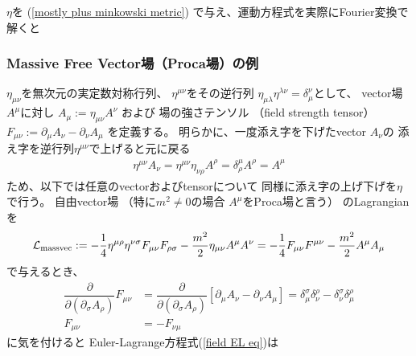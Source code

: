 $\eta$を
(\ref{mostly plus minkowski metric})
で与え、運動方程式を実際にFourier変換で解くと

\subsubsection{Massive Free Vector場（Proca場）の例}

$\eta_{\mu\nu}$を無次元の実定数対称行列、
$\eta^{\mu\nu}$をその逆行列
$\eta_{\mu\lambda} \eta^{\lambda \nu} = \delta_\mu^\nu$として、
vector場$A^\mu$に対し
$A_\mu := \eta_{\mu\nu} A^\nu$
および
場の強さテンソル
（field strength tensor）
$F_{\mu\nu} :=
\partial_\mu A_\nu
- \partial_\nu A_\mu$
を定義する。
明らかに、一度添え字を下げたvector $A_\nu$の
添え字を逆行列$\eta^{\mu\nu}$で上げると元に戻る
\begin{align}
    \eta^{\mu\nu} A_\nu
    =
    \eta^{\mu\nu} \eta_{\nu \rho} A^\rho
    =
    \delta^\mu_\rho A^\rho
    =
    A^\mu
\end{align}
ため、以下では任意のvectorおよびtensorについて
同様に添え字の上げ下げを$\eta$で行う。
自由vector場
（特に$m^2 \neq 0$の場合
$A^\mu$をProca場と言う）
のLagrangianを
\begin{align}
    \mathcal{L}_{\rm massvec}
    :=
    -
    \dfrac{1}{4}
        \eta^{\mu\rho}
        \eta^{\nu\sigma}
    F_{\mu\nu} F_{\rho\sigma}
    -
    \dfrac{m^2}{2}
        \eta_{\mu \nu}
        A^\mu A^\nu
=
    - \dfrac{1}{4}
    F_{\mu\nu} F^{\mu\nu}
    -
    \dfrac{m^2}{2}
        A^\mu A_\mu
\end{align}
で与えるとき、
\begin{align}
    \dfrac{\partial}
        {\partial (\partial_\sigma A_\rho)}
    F_{\mu\nu}
    &=
    \dfrac{\partial}
        {\partial (\partial_\sigma A_\rho)}
    \left[
        \partial_\mu A_\nu
        - \partial_\nu A_\mu
    \right]
    =
    \delta_\mu^\sigma
    \delta_\nu^\rho
    -
    \delta_\nu^\sigma
    \delta_\mu^\rho
\\
    F_{\mu\nu} &= - F_{\nu\mu}
\end{align}
に気を付けると
Euler-Lagrange方程式(\ref{field EL eq})は
